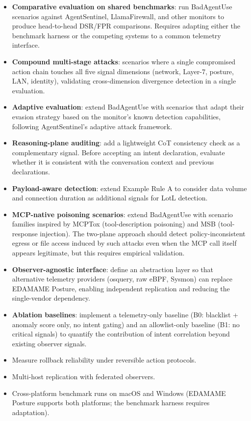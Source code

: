 \documentclass[
]{article}
\providecommand{\tightlist}{%
  \setlength{\itemsep}{0pt}\setlength{\parskip}{0pt}}
\begin{document}
\begin{itemize}
\tightlist
\item
  \textbf{Comparative evaluation on shared benchmarks}: run BadAgentUse
  scenarios against AgentSentinel, LlamaFirewall, and other monitors to
  produce head-to-head DSR/FPR comparisons. Requires adapting either the
  benchmark harness or the competing systems to a common telemetry
  interface.
\item
  \textbf{Compound multi-stage attacks}: scenarios where a single
  compromised action chain touches all five signal dimensions (network,
  Layer-7, posture, LAN, identity), validating cross-dimension
  divergence detection in a single evaluation.
\item
  \textbf{Adaptive evaluation}: extend BadAgentUse with scenarios that
  adapt their evasion strategy based on the monitor's known detection
  capabilities, following AgentSentinel's adaptive attack framework.
\item
  \textbf{Reasoning-plane auditing}: add a lightweight CoT consistency
  check as a complementary signal. Before accepting an intent
  declaration, evaluate whether it is consistent with the conversation
  context and previous declarations.
\item
  \textbf{Payload-aware detection}: extend Example Rule A to consider
  data volume and connection duration as additional signals for LotL
  detection.
\item
  \textbf{MCP-native poisoning scenarios}: extend BadAgentUse with
  scenario families inspired by MCPTox (tool-description poisoning) and
  MSB (tool-response injection). The two-plane approach should detect
  policy-inconsistent egress or file access induced by such attacks even
  when the MCP call itself appears legitimate, but this requires
  empirical validation.
\item
  \textbf{Observer-agnostic interface}: define an abstraction layer so
  that alternative telemetry providers (osquery, raw eBPF, Sysmon) can
  replace EDAMAME Posture, enabling independent replication and reducing
  the single-vendor dependency.
\item
  \textbf{Ablation baselines}: implement a telemetry-only baseline (B0:
  blacklist + anomaly score only, no intent gating) and an
  allowlist-only baseline (B1: no critical signals) to quantify the
  contribution of intent correlation beyond existing observer signals.
\item
  Measure rollback reliability under reversible action protocols.
\item
  Multi-host replication with federated observers.
\item
  Cross-platform benchmark runs on macOS and Windows (EDAMAME Posture
  supports both platforms; the benchmark harness requires adaptation).
\end{itemize}
\end{document}
